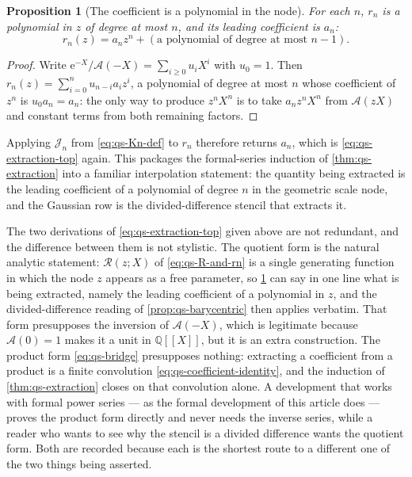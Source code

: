 \documentclass[11pt,oneside]{article}
\newtheorem{proposition}[theorem]{Proposition}
\theoremstyle{definition}
\theoremstyle{remark}
\newcommand{\Q}{\mathbb Q}
\newcommand{\e}{\mathrm e}
\begin{document}
\begin{proposition}[The coefficient is a polynomial in the node]
\label{prop:qs-coefficient-polynomial}
For each $n$, $r_n$ is a polynomial in $z$ of degree at most $n$, and its leading coefficient
is $a_n$:
\begin{equation*}
 r_n(z)=a_nz^n+(\text{a polynomial of degree at most }n-1).
\end{equation*}
\end{proposition}

\begin{proof}
Write $\e^{-X}/\mathscr A(-X)=\sum_{i\ge0}u_iX^i$ with $u_0=1$.  Then
$r_n(z)=\sum_{i=0}^{n}u_{n-i}a_iz^i$, a polynomial of degree at most $n$ whose coefficient of
$z^n$ is $u_0a_n=a_n$: the only way to produce $z^nX^n$ is to take $a_nz^nX^n$ from
$\mathscr A(zX)$ and constant terms from both remaining factors.
\end{proof}

Applying $\mathcal J_n$ from \eqref{eq:qs-Kn-def} to $r_n$ therefore returns $a_n$, which is
\eqref{eq:qs-extraction-top} again.  This packages the formal-series induction of
\cref{thm:qs-extraction} into a familiar interpolation statement: the quantity being
extracted is the leading coefficient of a polynomial of degree $n$ in the geometric scale
node, and the Gaussian row is the divided-difference stencil that extracts it.

The two derivations of \eqref{eq:qs-extraction-top} given above are not redundant, and the
difference between them is not stylistic.  The quotient form is the natural analytic
statement: $\mathscr R(z;X)$ of \eqref{eq:qs-R-and-rn} is a single generating function in
which the node $z$ appears as a free parameter, so
\cref{prop:qs-coefficient-polynomial} can say in one line what is being extracted, namely
the leading coefficient of a polynomial in $z$, and the divided-difference reading of
\cref{prop:qs-barycentric} then applies verbatim.  That form presupposes the inversion of
$\mathscr A(-X)$, which is legitimate because $\mathscr A(0)=1$ makes it a unit in
$\Q[[X]]$, but it is an extra construction.  The product form \eqref{eq:qs-bridge} presupposes
nothing: extracting a coefficient from a product is a finite convolution
\eqref{eq:qs-coefficient-identity}, and the induction of \cref{thm:qs-extraction} closes on
that convolution alone.  A development that works with formal power series --- as the formal
development of this article does --- proves the product form directly and never needs the
inverse series, while a reader who wants to see why the stencil is a divided difference wants
the quotient form.  Both are recorded because each is the shortest route to a different one
of the two things being asserted.
\end{document}
